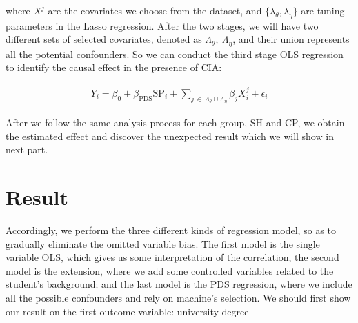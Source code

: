 \documentclass[]{AEA}
\begin{document}
    where $X^j$ are the covariates we choose from the dataset, and $\{\lambda_\theta,\lambda_\eta\}$ are tuning parameters in the Lasso regression.  After the two stages, we will have two different sets of selected covariates, denoted as $\Lambda_\theta,\ \Lambda_\eta$, and their union represents all the potential confounders.  So we can conduct the third stage OLS regression to identify the causal effect in the presence of CIA:

    \begin{align}
        Y_i = \beta_0 + \beta_{\text{PDS}}\text{SP}_i + \sum_{j \,\in\, \Lambda_\theta \cup \Lambda_\eta} \beta_j X_i^j + \epsilon_i
    \end{align}

    After we follow the same analysis process for each group, SH and CP, we obtain the estimated effect and discover the unexpected result which we will show in next part.


\section{Result}

    Accordingly, we perform the three different kinds of regression model, so as to gradually eliminate the omitted variable bias.  The first model is the single variable OLS, which gives us some interpretation of the correlation, the second model is the extension, where we add some controlled variables related to the student's background; and the last model is the PDS regression, where we include all the possible confounders and rely on machine's selection.  We should first show our result on the first outcome variable: university degree
\end{document}
